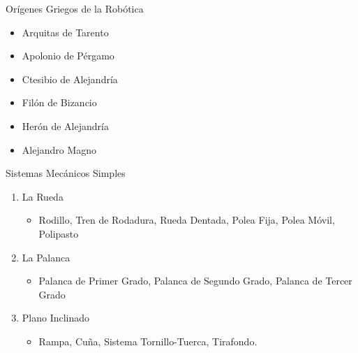 
\begin{frame}[fragile]{Orígenes Griegos de la Robótica}
\vspace{10px}
\pause
{}
\begin{block}{}
	\begin{itemize}
		\item Arquitas de Tarento
		\pause
		\item Apolonio de Pérgamo
		\pause
		\item Ctesibio de Alejandría
		\pause
		\item Filón de Bizancio
		\pause
		\item Herón de Alejandría
		\pause
		\item Alejandro Magno
	\end{itemize}
\end{block}
\end{frame}


\begin{frame}[fragile]{Sistemas Mecánicos Simples}
\vspace{10px}
\pause
{}
\begin{block}{}
	\begin{enumerate}
		\item La Rueda
		\pause
			\begin{itemize}
				\item Rodillo, Tren de Rodadura, Rueda Dentada, Polea Fija, Polea Móvil, Polipasto
				\pause
			\end{itemize}
		\item La Palanca
		\pause
			\begin{itemize}
				\item Palanca de Primer Grado, Palanca de Segundo Grado, Palanca de Tercer Grado
				\pause
			\end{itemize}
		\item Plano Inclinado
		\pause
			\begin{itemize}
				\item Rampa, Cuña, Sistema Tornillo-Tuerca, Tirafondo.
			\end{itemize}
	\end{enumerate}
\end{block}
\end{frame}

